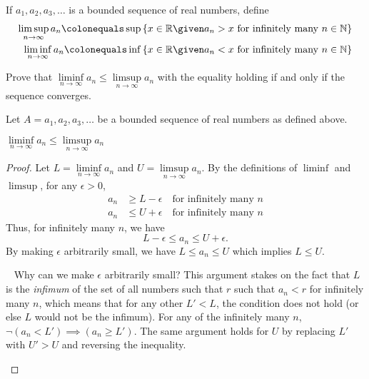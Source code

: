 \begin{problem}
  If $a_1, a_2, a_3, \ldots$ is a bounded sequence of real numbers, define
  \begin{align*}
    \limsup\limits_{n \to \infty}{a_n}
    \colonequals
    \sup \set{x \in \R \given a_n > x \text{ for infinitely many } n \in \N}
    \\
    \liminf\limits_{n \to \infty}{a_n}
    \colonequals
    \inf \set{x \in \R \given a_n < x \text{ for infinitely many } n \in \N}
  \end{align*}

  Prove that $\liminf\limits_{n \to \infty}{a_n} \leq \limsup\limits_{n \to \infty}{a_n}$
  with the equality holding if and only if the sequence converges.
\end{problem}

\begin{answer}
  Let $A = a_1, a_2, a_3, \ldots$ be a bounded sequence of real numbers as defined above.

  \begin{claim}
    $\liminf\limits_{n \to \infty}{a_n} \leq \limsup\limits_{n \to \infty}{a_n}$
    \begin{proof}
      Let $L = \liminf\limits_{n \to \infty}{a_n}$ and $U = \limsup\limits_{n \to \infty}{a_n}$.
      By the definitions of $\liminf$ and $\limsup$, for any $\epsilon > 0$,
      \begin{align*}
        a_n &\ge L - \epsilon \quad \text{for infinitely many } n \\
        a_n &\le U + \epsilon \quad \text{for infinitely many } n 
      \end{align*}
      Thus, for infinitely many $n$, we have
      \[ L - \epsilon \le a_n \le U + \epsilon. \]
      By making $\epsilon$ arbitrarily small, we have $L \le a_n \le U$
      which implies $L \le U$.
      \begin{remark}~\label{remark:explanation}
        Why can we make $\epsilon$ arbitrarily small?
        This argument stakes on the fact that $L$ is the \emph{infimum} of the set of all
        numbers such that $r$ such that $a_n < r$ for infinitely many $n$,
        which means that for any other $L' < L$,
        the condition does not hold (or else $L$ would not be the infimum).
        For any of the infinitely many $n$, $\lnot (a_n < L') \implies (a_n \geq L')$.
        The same argument holds for $U$ by replacing $L'$ with $U' > U$
        and reversing the inequality.
      \end{remark}
    \end{proof}
  \end{claim}


\end{answer}
